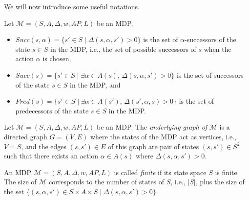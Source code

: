 We will now introduce some useful notations.

\begin{notation}
  Let $\mathcal{M}=(S, A, \Delta, w, AP, L)$ be an MDP,
  \begin{itemize}
    \item $Succ(s, \alpha) = \{ s' \in S \; | \; \Delta(s, \alpha, s') > 0 \}$
      is the set of $\alpha$-successors of the state $s \in S$ in the MDP, i.e., the set of possible successors of $s$ when the action $\alpha$ is chosen,
    \item $Succ(s) = \{ s' \in S \; | \; \exists \alpha \in A(s), \, \Delta(s, \alpha, s') > 0 \}$ is the set of successors of the state $s \in S$ in the MDP, and
    \item $Pred(s) = \{ s' \in S \; | \; \exists \alpha \in A(s'), \, \Delta(s', \alpha, s) > 0 \}$ is the set of predecessors of the state $s \in S$ in the MDP.
  \end{itemize}
\end{notation}

\begin{definition}
  Let $\mathcal{M}=(S, A, \Delta, w, AP, L)$ be an MDP. The \textit{underlying graph of} $\mathcal{M}$ is a directed graph $G = (V, E)$ where the states of the MDP act as vertices, i.e., $V = S$, and the edges $(s, s') \in E$ of this graph are pair of states $(s, s')\in S^2$ such that there exists an action $\alpha \in A(s)$ where $\Delta(s, \alpha, s')>0$.
\end{definition}

\begin{notation}
  An MDP $\mathcal{M}=(S, A, \Delta, w, AP, L)$ is called \textit{finite} if its state space $S$ is finite. The size of $\mathcal{M}$ corresponds to
  the number of states of $S$, i.e., $|S|$, plus
  the size
  of the set $\{(s, \alpha, s') \in S \times A \times S \; | \; \Delta(s, \alpha, s') > 0 \}$.
\end{notation}

